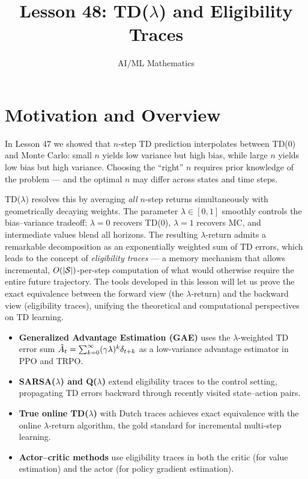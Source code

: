 \documentclass[11pt,a4paper]{article}
\title{Lesson 48: TD($\lambda$) and Eligibility Traces}
\author{AI/ML Mathematics}
\date{}
\begin{document}
\maketitle
\tableofcontents
\newpage

\section{Motivation and Overview}
\label{sec:motivation}

In Lesson 47 we showed that $n$-step TD prediction interpolates between
TD(0) and Monte Carlo: small $n$ yields low variance but high bias,
while large $n$ yields low bias but high variance. Choosing the ``right''
$n$ requires prior knowledge of the problem --- and the optimal $n$ may
differ across states and time steps.

TD($\lambda$) resolves this by averaging \emph{all} $n$-step returns
simultaneously with geometrically decaying weights. The parameter
$\lambda \in [0,1]$ smoothly controls the bias--variance tradeoff:
$\lambda = 0$ recovers TD(0), $\lambda = 1$ recovers MC, and
intermediate values blend all horizons. The resulting $\lambda$-return
admits a remarkable decomposition as an exponentially weighted sum of
TD errors, which leads to the concept of \emph{eligibility traces} ---
a memory mechanism that allows incremental, $O(|\mathcal{S}|)$-per-step
computation of what would otherwise require the entire future trajectory.
The tools developed in this lesson will let us prove the exact
equivalence between the forward view (the $\lambda$-return) and the
backward view (eligibility traces), unifying the theoretical and
computational perspectives on TD learning.

\begin{rlconnection}[title={Where TD($\lambda$) and Eligibility Traces Appear}]
\begin{itemize}[nosep]
  \item \textbf{Generalized Advantage Estimation (GAE)} uses the
    $\lambda$-weighted TD error sum
    $\hat{A}_t = \sum_{k=0}^\infty (\gamma\lambda)^k \delta_{t+k}$
    as a low-variance advantage estimator in PPO and TRPO.
  \item \textbf{SARSA($\lambda$) and Q($\lambda$)} extend eligibility
    traces to the control setting, propagating TD errors backward
    through recently visited state--action pairs.
  \item \textbf{True online TD($\lambda$)} with Dutch traces achieves
    exact equivalence with the online $\lambda$-return algorithm, the
    gold standard for incremental multi-step learning.
  \item \textbf{Actor--critic methods} use eligibility traces in both
    the critic (for value estimation) and the actor (for policy
    gradient estimation).
\end{itemize}
\end{rlconnection}
\end{document}
